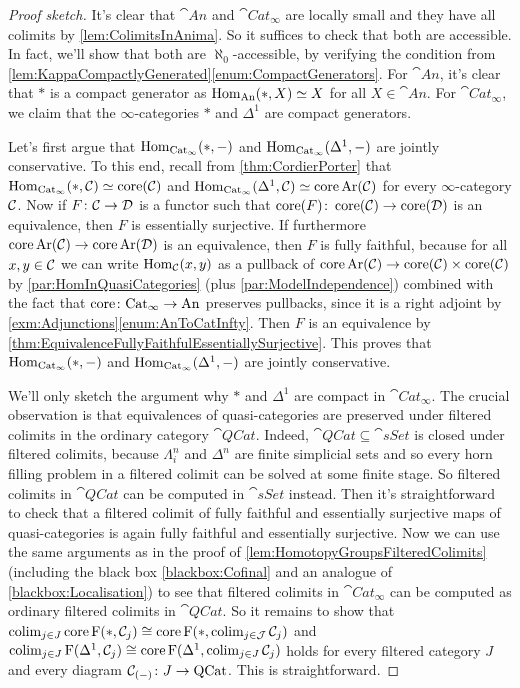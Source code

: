 \begin{proof}[Proof sketch]
	It's clear that $\cat{An}$ and $\cat{Cat}_\infty$ are locally small and they have all colimits by \cref{lem:ColimitsInAnima}. So it suffices to check that both are accessible. In fact, we'll show that both are $\aleph_0$-accessible, by verifying the condition from \cref{lem:KappaCompactlyGenerated}\cref{enum:CompactGenerators}. For $\cat{An}$, it's clear that $*$ is a compact generator as $\operatorname{Hom}_{\mathrm{An}}(*,X)\simeq X$ for all $X\in\cat{An}$. For $\cat{Cat}_\infty$, we claim that the $\infty$-categories $*$ and $\Delta^1$ are compact generators. 
	
	Let's first argue that $\operatorname{Hom}_{\mathrm{Cat}_\infty}(*,-)$ and $\operatorname{Hom}_{\mathrm{Cat}_\infty}(\Delta^1,-)$ are jointly conservative. To this end, recall from \cref{thm:CordierPorter} that $\operatorname{Hom}_{\mathrm{Cat}_\infty}(*,\mathcal{C})\simeq \operatorname{core}(\mathcal{C})$ and $\operatorname{Hom}_{\mathrm{Cat}_\infty}(\Delta^1,\mathcal{C})\simeq \operatorname{core}\operatorname{Ar}(\mathcal{C})$ for every $\infty$-category $\mathcal{C}$. Now if $F\colon \mathcal{C}\rightarrow\mathcal{D}$ is a functor such that $\operatorname{core}(F)\colon \operatorname{core}(\mathcal{C})\rightarrow\operatorname{core}(\mathcal{D})$ is an equivalence, then $F$ is essentially surjective. If furthermore $\operatorname{core} \operatorname{Ar}(\mathcal{C})\rightarrow\operatorname{core}\operatorname{Ar}(\mathcal{D})$ is an equivalence, then $F$ is fully faithful, because for all $x,y\in\mathcal{C}$ we can write $\operatorname{Hom}_{\mathcal{C}}(x,y)$ as a pullback of $\operatorname{core}\operatorname{Ar}(\mathcal{C})\rightarrow\operatorname{core}(\mathcal{C})\times\operatorname{core}(\mathcal{C})$ by \cref{par:HomInQuasiCategories} (plus \cref{par:ModelIndependence}) combined with the fact that $\operatorname{core}\colon \mathrm{Cat}_\infty\rightarrow\mathrm{An}$ preserves pullbacks, since it is a right adjoint by \cref{exm:Adjunctions}\cref{enum:AnToCatInfty}. Then $F$ is an equivalence by \cref{thm:EquivalenceFullyFaithfulEssentiallySurjective}. This proves that $\operatorname{Hom}_{\mathrm{Cat}_\infty}(*,-)$ and $\operatorname{Hom}_{\mathrm{Cat}_\infty}(\Delta^1,-)$ are jointly conservative.
	
	We'll only sketch the argument why $*$ and $\Delta^1$ are compact in $\cat{Cat}_\infty$. The crucial observation is that equivalences of quasi-categories are preserved under filtered colimits in the ordinary category $\cat{QCat}$. Indeed, $\cat{QCat}\subseteq \cat{sSet}$ is closed under filtered colimits, because $\Lambda_i^n$ and $\Delta^n$ are finite simplicial sets and so every horn filling problem in a filtered colimit can be solved at some finite stage. So filtered colimits in $\cat{QCat}$ can be computed in $\cat{sSet}$ instead. Then it's straightforward to check that a filtered colimit of fully faithful and essentially surjective maps of quasi-categories is again fully faithful and essentially surjective. Now we can use the same arguments as in the proof of \cref{lem:HomotopyGroupsFilteredColimits} (including the black box \cref{blackbox:Cofinal} and an analogue of \cref{blackbox:Localisation}) to see that filtered colimits in $\cat{Cat}_\infty$ can be computed as ordinary filtered colimits in $\cat{QCat}$. So it remains to show that $ \operatorname*{colim}_{j\in J}\operatorname{core} \operatorname{F}(*,\mathcal{C}_j)\cong \operatorname{core} \operatorname{F}(*,\operatorname*{colim}_{j\in\mathcal{J}}\mathcal{C}_j)$ and $\operatorname*{colim}_{j\in J}\operatorname{F}(\Delta^1,\mathcal{C}_j)\cong \operatorname{core}\operatorname{F}(\Delta^1,\operatorname*{colim}_{j\in J}\mathcal{C}_j)$ holds for every filtered category $J$ and every diagram $\mathcal{C}_{(-)}\colon J\rightarrow\mathrm{QCat}$. This is straightforward.
\end{proof}
